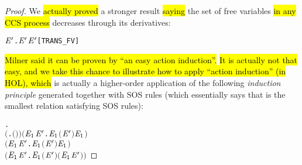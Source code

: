 \begin{proof}
We \hl{actually proved} a stronger result \hl{saying} the set of free
variables \hl{in any CCS process} decreases through its derivatives:
\begin{alltt}
\HOLTokenTurnstile{} \HOLSymConst{\HOLTokenForall{}}  \ensuremath{\HOLBoundVar{E}\sp{\prime}}.  \HOLTokenTransBegin{}\HOLTokenTransEnd \ensuremath{\HOLBoundVar{E}\sp{\prime}} \HOLSymConst{\HOLTokenImp{}}  \ensuremath{\HOLBoundVar{E}\sp{\prime}} \HOLSymConst{\HOLTokenSubset{}}  \hfill{[TRANS_FV]}
\end{alltt}

\hl{Milner said it can be proven by ``an easy action induction''.}
\hl{It is actually not that easy, and we take this chance to
  illustrate how to apply ``action induction'' (in HOL), which} is actually a higher-order application
of the following \emph{induction principle} generated together with SOS
rules (which essentially says that  is the smallest relation
satisfying SOS rules):
\begin{alltt}
\HOLTokenTurnstile{} \HOLSymConst{\HOLTokenForall{}}.
       \ensuremath{(}\HOLSymConst{\HOLTokenForall{}} .  \ensuremath{(}\HOLSymConst{\ensuremath{\ldotp}}\ensuremath{)}  \ensuremath{)} \HOLSymConst{\HOLTokenConj{}} \ensuremath{(}\HOLSymConst{\HOLTokenForall{}}  \ensuremath{\HOLBoundVar{E}\sb{\mathrm{1}}} \ensuremath{\HOLBoundVar{E}\sp{\prime}}.    \ensuremath{\HOLBoundVar{E}\sb{\mathrm{1}}} \HOLSymConst{\HOLTokenImp{}}  \ensuremath{(} \HOLSymConst{\ensuremath{+}} \ensuremath{\HOLBoundVar{E}\sp{\prime}}\ensuremath{)}  \ensuremath{\HOLBoundVar{E}\sb{\mathrm{1}}}\ensuremath{)} \HOLSymConst{\HOLTokenConj{}}
       \ensuremath{(}\HOLSymConst{\HOLTokenForall{}}  \ensuremath{\HOLBoundVar{E}\sb{\mathrm{1}}} \ensuremath{\HOLBoundVar{E}\sp{\prime}}.    \ensuremath{\HOLBoundVar{E}\sb{\mathrm{1}}} \HOLSymConst{\HOLTokenImp{}}  \ensuremath{(}\ensuremath{\HOLBoundVar{E}\sp{\prime}} \HOLSymConst{\ensuremath{+}} \ensuremath{)}  \ensuremath{\HOLBoundVar{E}\sb{\mathrm{1}}}\ensuremath{)} \HOLSymConst{\HOLTokenConj{}}
       \ensuremath{(}\HOLSymConst{\HOLTokenForall{}}  \ensuremath{\HOLBoundVar{E}\sb{\mathrm{1}}} \ensuremath{\HOLBoundVar{E}\sp{\prime}}.    \ensuremath{\HOLBoundVar{E}\sb{\mathrm{1}}} \HOLSymConst{\HOLTokenImp{}}  \ensuremath{(} \HOLSymConst{\ensuremath{\mid}} \ensuremath{\HOLBoundVar{E}\sp{\prime}}\ensuremath{)}  \ensuremath{(}\ensuremath{\HOLBoundVar{E}\sb{\mathrm{1}}} \HOLSymConst{\ensuremath{\mid}} \ensuremath{\HOLBoundVar{E}\sp{\prime}}\ensuremath{)}\ensuremath{)} \HOLSymConst{\HOLTokenConj{}}

\end{alltt}
\end{proof}
